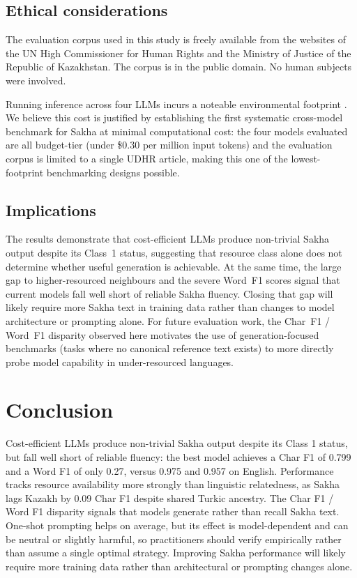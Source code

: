 \documentclass[11pt]{article}
\begin{document}
\subsection{Ethical considerations}

The evaluation corpus used in this study is freely available from the websites of the UN High Commissioner for Human Rights and the Ministry of Justice of the Republic of Kazakhstan. The corpus is in the public domain. No human subjects were involved.

Running inference across four LLMs incurs a noteable environmental footprint \cite{wu-etal-2025-unveiling}. We believe this cost is justified by establishing the first systematic cross-model benchmark for Sakha at minimal computational cost: the four models evaluated are all budget-tier (under \$0.30 per million input tokens) and the evaluation corpus is limited to a single UDHR article, making this one of the lowest-footprint benchmarking designs possible.

\subsection{Implications}

The results demonstrate that cost-efficient LLMs produce non-trivial Sakha output despite its Class~1 status, suggesting that resource class alone does not determine whether useful generation is achievable.
At the same time, the large gap to higher-resourced neighbours and the severe Word~F1 scores signal that current models fall well short of reliable Sakha fluency.
Closing that gap will likely require more Sakha text in training data rather than changes to model architecture or prompting alone.
For future evaluation work, the Char~F1 / Word~F1 disparity observed here motivates the use of generation-focused benchmarks (tasks where no canonical reference text exists) to more directly probe model capability in under-resourced languages.

\section{Conclusion}
Cost-efficient LLMs produce non-trivial Sakha output despite its Class 1 status, but fall well short of reliable fluency: the best model achieves a Char F1 of 0.799 and a Word F1 of only 0.27, versus 0.975 and 0.957 on English.
Performance tracks resource availability more strongly than linguistic relatedness, as Sakha lags Kazakh by 0.09 Char F1 despite shared Turkic ancestry.
The Char F1 / Word F1 disparity signals that models generate rather than recall Sakha text.
One-shot prompting helps on average, but its effect is model-dependent and can be neutral or slightly harmful, so practitioners should verify empirically rather than assume a single optimal strategy.
Improving Sakha performance will likely require more training data rather than architectural or prompting changes alone.


\end{document}
